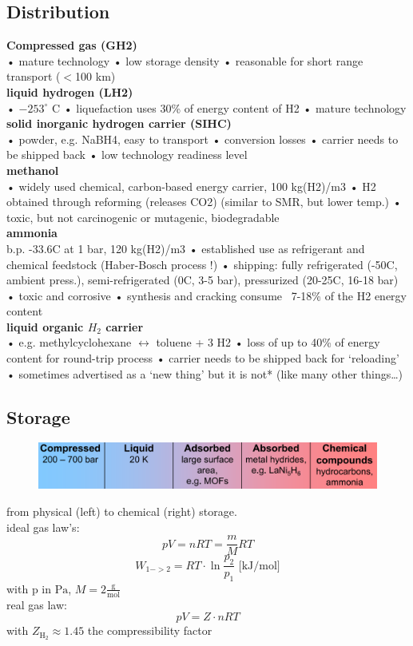 \documentclass[a4paper,10pt,landscape]{scrartcl}
\begin{document}
\begin{multicols*}{3}
\subsection{Distribution}
\textbf{Compressed gas (GH2)} \\
• mature technology
• low storage density
• reasonable for short range transport ($<$100 km)  \\
\textbf{liquid hydrogen (LH2)} \\
• $-253^\circ $ C
• liquefaction uses 30\% of energy content of H2
• mature technology \\
\textbf{solid inorganic hydrogen carrier (SIHC)} \\
• powder, e.g. NaBH4, easy to transport
• conversion losses
• carrier needs to be shipped back
• low technology readiness level \\
\textbf{methanol} \\
• widely used chemical, carbon-based energy carrier, 100 kg(H2)/m3
• H2 obtained through reforming (releases CO2) (similar to SMR, but lower temp.)
• toxic, but not carcinogenic or mutagenic, biodegradable \\
\textbf{ammonia} \\
b.p. -33.6C at 1 bar, 120 kg(H2)/m3
• established use as refrigerant and chemical feedstock (Haber-Bosch process !)
• shipping: fully refrigerated (-50C, ambient press.), semi-refrigerated (0C, 3-5 bar),
pressurized (20-25C, 16-18 bar)
• toxic and corrosive
• synthesis and cracking consume ~7-18\% of the H2 energy content \\
\textbf{liquid organic $H_2$ carrier} \\
• e.g. methylcyclohexane $\leftrightarrow$ toluene + 3 H2
• loss of up to 40\% of energy content for round-trip process
• carrier needs to be shipped back for ‘reloading’
• sometimes advertised as a ‘new thing’ but it is not* (like many other things…) 

\subsection{Storage}
\begin{figure}[H]
    \centering
    \includegraphics[width=1\linewidth]{src/h2_storage.png}
\end{figure}
from physical (left) to chemical (right) storage. \\
ideal gas law's:
$$pV=nRT=\frac{m}{M}RT$$
$$W_{1->2}=RT\cdot \ln{\frac{p_2}{p_1}}\text{ [kJ/mol]}$$ 
with p in $\mathrm{Pa}$, $M=2\mathrm{\frac{g}{mol}}$ \\
real gas law:
$$pV=Z\cdot nRT$$ 
with $Z_\mathrm{H_2}\approx1.45$ the compressibility factor


\end{multicols*}
\end{document}
